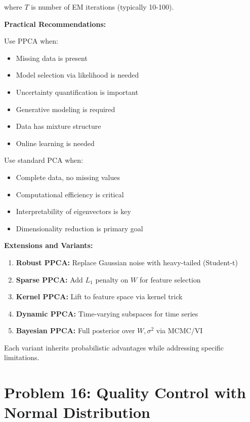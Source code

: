 \documentclass[12pt]{article}
\begin{document}
\begin{explanation}
where $T$ is number of EM iterations (typically 10-100).

\textbf{Practical Recommendations:}

Use PPCA when:
\begin{itemize}
    \item Missing data is present
    \item Model selection via likelihood is needed
    \item Uncertainty quantification is important
    \item Generative modeling is required
    \item Data has mixture structure
    \item Online learning is needed
\end{itemize}

Use standard PCA when:
\begin{itemize}
    \item Complete data, no missing values
    \item Computational efficiency is critical
    \item Interpretability of eigenvectors is key
    \item Dimensionality reduction is primary goal
\end{itemize}

\textbf{Extensions and Variants:}

\begin{enumerate}
    \item \textbf{Robust PPCA:} Replace Gaussian noise with heavy-tailed (Student-t)
    \item \textbf{Sparse PPCA:} Add $L_1$ penalty on $W$ for feature selection
    \item \textbf{Kernel PPCA:} Lift to feature space via kernel trick
    \item \textbf{Dynamic PPCA:} Time-varying subspaces for time series
    \item \textbf{Bayesian PPCA:} Full posterior over $W, \sigma^2$ via MCMC/VI
\end{enumerate}

Each variant inherits probabilistic advantages while addressing specific limitations.

\end{explanation}

\newpage
\section{Problem 16: Quality Control with Normal Distribution}
\end{document}
